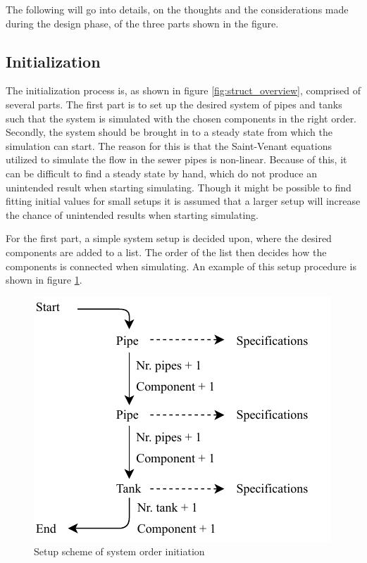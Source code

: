 
The following will go into details, on the thoughts and the considerations made during the design phase, of the three parts shown in the figure.

\subsection*{Initialization} 
The initialization process is, as shown in figure \ref{fig:struct_overview}, comprised of several parts. The first part is to set up the desired system of pipes and tanks such that the system is simulated with the chosen components in the right order.
Secondly, the system should be brought in to a steady state from which the simulation can start.
The reason for this is that the Saint-Venant equations utilized to simulate the flow in the sewer pipes is non-linear. Because of this, it can be difficult to find a steady state by hand, which do not produce an unintended result when starting simulating. Though it might be possible to find fitting initial values for small setups it is assumed that a larger setup will increase the chance of unintended results when starting simulating.

For the first part, a simple system setup is decided upon, where the desired components are added to a list. The order of the list then decides how the components is connected when simulating. An example of this setup procedure is shown in figure \ref{fig:sys_setup}. 

\begin{figure}[H]
\centering
\includegraphics[width=0.5 \textwidth]{report/simulation/pictures/sys_setup.pdf}
\caption{Setup scheme of system order initiation}
\label{fig:sys_setup}
\end{figure}

